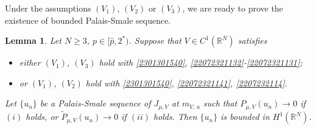 \documentclass[10pt]{article}
\numberwithin{equation}{section}
\newtheorem{lemma}[theorem]{Lemma}
\numberwithin{equation}{section}
\begin{document}
Under the assumptions $(V_1)$, $(V_2)$ or $(V_3)$, we are ready to prove the existence of bounded Palais-Smale sequence.
\begin{lemma}\label{22072315}
Let $N\ge 3$, $p\in [\hat{p}, 2^*)$. Suppose that $V\in C^1(\mathbb{R}^N)$ satisfies
\begin{itemize}
\item[$(i)$] either $(V_1)$, $(V_3)$ hold with \eqref{2301301540}, \eqref{22072321132}-\eqref{22072321131};
\item[$(ii)$] or $(V_1)$, $(V_2)$ hold with \eqref{2301301540}, \eqref{22072321141}, \eqref{2207232114}.
\end{itemize}
Let $\{u_n\}$ be a Palais-Smale sequence of $J_{\mu, V}$ at ${m}_{V,\, a}$ such that $P_{\mu, V}(u_n)\to 0$ if $(i)$ holds, or $\widetilde{P}_{\mu, V}(u_n)\to 0$ if $(ii)$ holds. Then $\{u_n\}$ is bounded in $H^1(\mathbb{R}^N)$.
\end{lemma}
\end{document}
